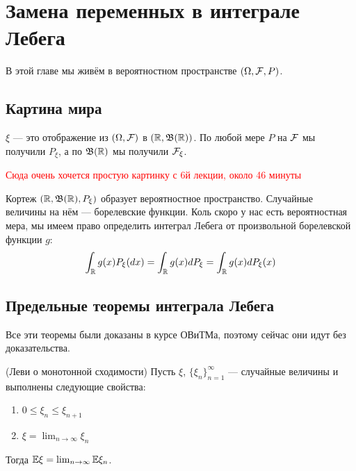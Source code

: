 \section{Замена переменных в интеграле Лебега}

\begin{note}
	В этой главе мы живём в вероятностном пространстве $(\Omega, \mathcal{F}, P)$.
\end{note}

\subsection{Картина мира}

\begin{note}
	$\xi$ --- это отображение из $(\Omega, \mathcal{F})$ в $(\mathbb{R}, \mathfrak{B}(\mathbb{R}))$. По любой мере $P$ на $\mathcal{F}$ мы получили $P_\xi$, а по $\mathfrak{B}(\mathbb{R})$ мы получили $\mathcal{F}_\xi$.
	
	\textcolor{red}{Сюда очень хочется простую картинку с 6й лекции, около 46 минуты}
	
	Кортеж $(\mathbb{R}, \mathfrak{B}(\mathbb{R}), P_\xi)$ образует вероятностное пространство. Случайные величины на нём --- борелевские функции. Коль скоро у нас есть вероятностная мера, мы имеем право определить интеграл Лебега от произвольной борелевской функции $g$:
	\[
		\int_{\mathbb{R}} g(x)P_\xi(dx) = \int_{\mathbb{R}} g(x)dP_\xi = \int_{\mathbb{R}} g(x)dP_\xi(x)
	\]
\end{note}

\subsection{Предельные теоремы интеграла Лебега}

\begin{note}
	Все эти теоремы были доказаны в курсе ОВиТМа, поэтому сейчас они идут без доказательства.
\end{note}

\begin{theorem} (Леви о монотонной сходимости)
	Пусть $\xi$, $\{\xi_n\}_{n = 1}^\infty$ --- случайные величины и выполнены следующие свойства:
	\begin{enumerate}
		\item $0 \le \xi_n \le \xi_{n + 1}$
		
		\item $\xi = \lim_{n \to \infty} \xi_n$
	\end{enumerate}
	Тогда $\mathbb{E}\xi = \lim_{n \to \infty} \mathbb{E}\xi_n$.
\end{theorem}

